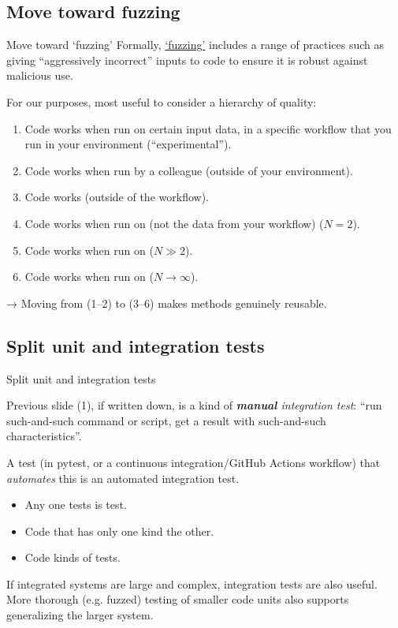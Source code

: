\documentclass[12pt,aspectratio=169]{beamer}
\begin{document}
\subsection{Move toward fuzzing}
\begin{frame}{Move toward ‘fuzzing’}
Formally, \href{https://en.wikipedia.org/wiki/Fuzzing}{‘fuzzing’} includes a range of practices such as giving “aggressively incorrect” inputs to code to ensure it is robust against malicious use.

\medskip
For our purposes, most useful to consider a hierarchy of quality:
\begin{enumerate}
    \item Code works when run on certain input data, in a specific workflow that you run in your environment (“experimental”).
    \item Code works when run by a colleague (outside of your environment).
    \item Code works  (outside of the workflow).
    \item Code works when run on  (not the data from your workflow) ($N=2$).
    \item Code works when run on  ($N \gg 2$).
    \item Code works when run on   ($N \rightarrow \infty$).
\end{enumerate}

\medskip
\hspace{14mm}→ Moving from (1–2) to (3–6) makes methods genuinely reusable.
\end{frame}

\subsection{Split unit and integration tests}
\begin{frame}{Split unit and integration tests}

Previous slide (1), if written down, is a kind of \emph{\textbf{manual} integration test}: “run such-and-such command or script, get a result with such-and-such characteristics”.

\smallskip
A test (in pytest, or a continuous integration/GitHub Actions workflow) that \emph{automates} this is an automated integration test.

\medskip
\begin{itemize}
  \item Any one tests is  test.
  \item Code that has only one kind  the other.
  \item Code  kinds of tests.
\end{itemize}

\medskip
If integrated systems are large and complex,  integration tests are also useful.
More thorough (e.g. fuzzed) testing of smaller code units also supports generalizing the larger system.
\end{frame}
\end{document}
